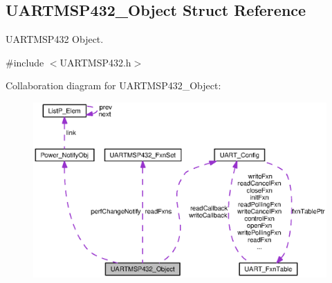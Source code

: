 \subsection{U\+A\+R\+T\+M\+S\+P432\+\_\+\+Object Struct Reference}
\label{struct_u_a_r_t_m_s_p432___object}


U\+A\+R\+T\+M\+S\+P432 Object.  




{\ttfamily \#include $<$U\+A\+R\+T\+M\+S\+P432.\+h$>$}



Collaboration diagram for U\+A\+R\+T\+M\+S\+P432\+\_\+\+Object\+:
\nopagebreak
\begin{figure}[H]
\begin{center}
\leavevmode
\includegraphics[width=350pt]{struct_u_a_r_t_m_s_p432___object__coll__graph}
\end{center}
\end{figure}
